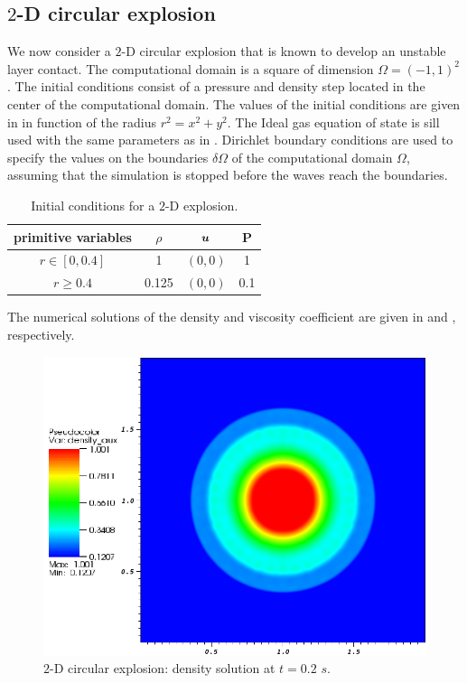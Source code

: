 \subsection{$2$-D circular explosion} \label{sec:2d-circular-explosioin}
We now consider a $2$-D circular explosion \cite{Toro} that is known to develop an unstable layer contact. The computational domain is a square of dimension $\Omega = (-1, 1)^2$. The initial conditions consist of a pressure and density step located in the center of the computational domain. The values of the initial conditions are given in  in function of the radius $r^2 = x^2 + y^2$. The Ideal gas equation of state is sill used with the same parameters as in . Dirichlet boundary conditions are used to specify the values on the boundaries $\delta \Omega$ of the computational domain $\Omega$, assuming that the simulation is stopped before the waves reach the boundaries.
\begin{table}[H] 
\caption{\label{tb:ic-explosion} Initial conditions for a $2$-D explosion.}
\begin{center}
\begin{tabular}{|c|c|c|c|}
\hline
 primitive variables   & $\rho$ & $\boldsymbol u$ & P \\ \hline
 $r \in [ 0, 0.4 ]$& 1 & $(0,0)$ & 1\\ \hline
  $r \geq 0.4$& 0.125 & $(0,0)$ & 0.1\\ \hline
\end{tabular}
\end{center}
\nonumber
\end{table}
The numerical solutions of the density and viscosity coefficient are given in  and , respectively.
%
\begin{figure}[H]
\centering
\includegraphics[width=\textwidth]{figures/Explosion_density_profiles.png}
\caption{$2$-D circular explosion: density solution at $t=0.2$ $s$.}
\label{fig:2d_explosion_density_sct3}
\end{figure}
